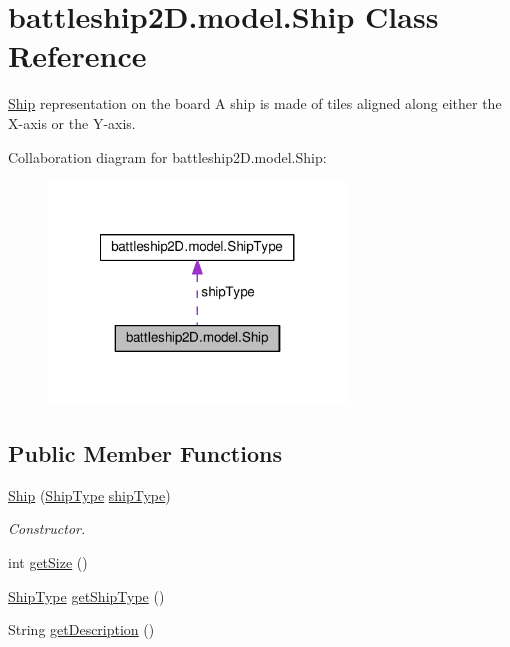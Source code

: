 \hypertarget{classbattleship2D_1_1model_1_1Ship}{\section{battleship2\-D.\-model.\-Ship Class Reference}
\label{classbattleship2D_1_1model_1_1Ship}
}


\hyperlink{classbattleship2D_1_1model_1_1Ship}{Ship} representation on the board A ship is made of tiles aligned along either the X-\/axis or the Y-\/axis.  




Collaboration diagram for battleship2\-D.\-model.\-Ship\-:\nopagebreak
\begin{figure}[H]
\begin{center}
\leavevmode
\includegraphics[width=224pt]{classbattleship2D_1_1model_1_1Ship__coll__graph}
\end{center}
\end{figure}
\subsection*{Public Member Functions}
\begin{DoxyCompactItemize}
\item 
\hyperlink{classbattleship2D_1_1model_1_1Ship_a87eba7afe7524d43b60439a5fd269009}{Ship} (\hyperlink{enumbattleship2D_1_1model_1_1ShipType}{Ship\-Type} \hyperlink{classbattleship2D_1_1model_1_1Ship_a9291fcd44b67561c908b6c7e47dc844f}{ship\-Type})
\begin{DoxyCompactList}\small\item\em Constructor. \end{DoxyCompactList}\item 
int \hyperlink{classbattleship2D_1_1model_1_1Ship_ab572418d97ac961f1a6e59f7ea082a99}{get\-Size} ()
\item 
\hyperlink{enumbattleship2D_1_1model_1_1ShipType}{Ship\-Type} \hyperlink{classbattleship2D_1_1model_1_1Ship_a6fccc3e46fdcf915a65e2e51d0da91c6}{get\-Ship\-Type} ()
\item 
String \hyperlink{classbattleship2D_1_1model_1_1Ship_acf78dc2817640d57af66e296f3072123}{get\-Description} ()
\end{DoxyCompactItemize}

